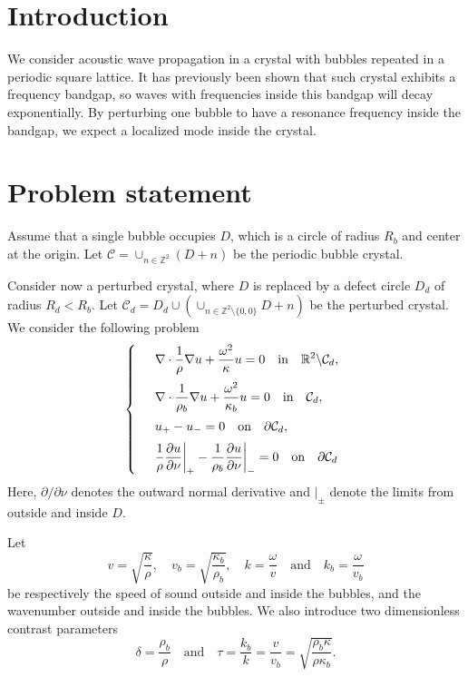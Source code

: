 \documentclass[a4paper]{article}
\author{Erik Orvehed Hiltunen}
\theoremstyle{definition}
\newcommand{\Z}{\mathbb{Z}}
\newcommand{\R}{\mathbb{R}}
\newcommand{\C}{\mathcal{C}}
\newcommand{\ds}{\displaystyle}
\def\nm{\noalign{\medskip}}
\begin{document}
\section{Introduction}
We consider acoustic wave propagation in a crystal with bubbles repeated in a periodic square lattice. It has previously been shown that such crystal exhibits a frequency bandgap, so waves with frequencies inside this bandgap will decay exponentially. By perturbing one bubble to have a resonance frequency inside the bandgap, we expect a localized mode inside the crystal. 


\section{Problem statement}
Assume that a single bubble occupies $D$, which is a circle of radius $R_b$ and center at the origin. Let $\C = \cup_{n\in\Z^2}(D+n)$ be the periodic bubble crystal.

Consider now a perturbed crystal, where $D$ is replaced by a defect circle $D_d$ of radius $R_d < R_b$. Let $\C_d = D_d \cup \left( \cup_{n\in\Z^2\setminus\{0,0\}} D+n \right)$ be the perturbed crystal. We consider the following problem
\begin{equation} \label{eq:scattering}
\left\{
\begin{array} {ll}
	&\ds \nabla \cdot \frac{1}{\rho} \nabla  u+ \frac{\omega^2}{\kappa} u  = 0 \quad \text{in} \quad \R^2 \backslash \C_d, \\
	\nm
	&\ds \nabla \cdot \frac{1}{\rho_b} \nabla  u+ \frac{\omega^2}{\kappa_b} u  = 0 \quad \text{in} \quad \C_d, \\
	\nm
	&\ds  u_{+} -u_{-}  =0   \quad \text{on} \quad \partial \C_d, \\
	\nm
	& \ds  \frac{1}{\rho} \frac{\partial u}{\partial \nu} \bigg|_{+} - \frac{1}{\rho_b} \frac{\partial u}{\partial \nu} \bigg|_{-} =0 \quad \text{on} \quad \partial \C_d
\end{array}
\right.
\end{equation}
Here, $\partial/\partial \nu$ denotes the outward normal derivative and $|_\pm$ denote the limits from outside and inside $D$.  

Let
\begin{equation*} %
v = \sqrt{\frac{\kappa}{\rho}}, \quad v_b = \sqrt{\frac{\kappa_b}{\rho_b}}, \quad k= \frac{\omega}{v} \quad \text{and} \quad k_b= \frac{\omega}{v_b}
\end{equation*}
be respectively the speed of sound outside and inside the bubbles, and the wavenumber outside and inside the bubbles. We also introduce two dimensionless contrast parameters
\begin{equation*} %
\delta = \frac{\rho_b}{\rho} \quad \text{and} \quad \tau= \frac{k_b}{k}= \frac{v}{v_b} =\sqrt{\frac{\rho_b \kappa}{\rho \kappa_b}}. 
\end{equation*}
\end{document}

